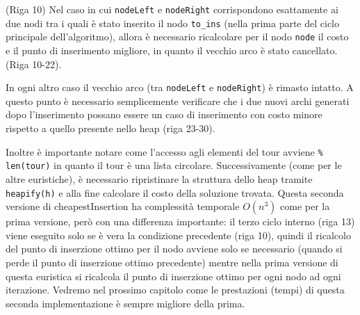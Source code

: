 \documentclass[a4paper,12pt]{report}
\begin{document}
\begin{legal}
  \item (Riga 10) Nel caso in cui \lstinline!nodeLeft! e \lstinline!nodeRight! corrispondono esattamente ai due nodi tra i quali è stato inserito il nodo \lstinline!to_ins! (nella prima parte del ciclo principale dell'algoritmo), allora è necessario ricalcolare per il nodo \lstinline!node! il costo e il punto di inserimento migliore, in quanto il vecchio arco è stato cancellato. (Riga 10-22).
  \item In ogni altro caso il vecchio arco (tra \lstinline!nodeLeft! e \lstinline!nodeRight!) è rimasto intatto. A questo punto è necessario semplicemente verificare che i due nuovi archi generati dopo l'inserimento possano essere un caso di inserimento con costo minore rispetto a quello presente nello heap (riga 23-30).
\end{legal}
Inoltre è importante notare come l'accesso agli elementi del tour avviene \lstinline!% len(tour)! in quanto il tour è una lista circolare.
Successivamente (come per le altre euristiche), è necessario ripristinare la struttura dello heap tramite \lstinline!heapify(h)! e alla fine calcolare il costo della soluzione trovata. \newline
Questa seconda versione di cheapestInsertion ha complessità temporale $O(n^3)$ come per la prima versione, però con una differenza importante: il terzo ciclo interno (riga 13) viene eseguito solo se è vera la condizione precedente (riga 10), quindi il ricalcolo del punto di inserzione ottimo per il nodo avviene solo se necessario (quando si perde il punto di inserzione ottimo precedente) mentre nella prima versione di questa euristica si ricalcola il punto di inserzione ottimo per ogni nodo ad ogni iterazione. Vedremo nel prossimo capitolo come le prestazioni (tempi) di questa seconda implementazione è sempre migliore della prima.
\end{document}
